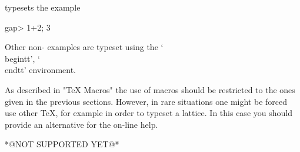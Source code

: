 typesets the example

\beginexample
    gap> 1+2;
    3
\endexample

Other non-{\GAP} examples are typeset using the `\\begintt', `\\endtt'
environment.


As  described in "TeX Macros"  the use of  macros should be restricted to
the ones given in the previous sections.  However, in rare situations one
might be forced  use  other {\TeX}, for  example  in order  to  typeset a
lattice.  In this case you should provide  an alternative for the on-line
help.

*@NOT SUPPORTED YET@*


